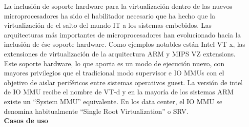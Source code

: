 La inclusión de soporte hardware para la virtualización dentro de las nuevos microprocesadores ha sido
el habilitador necesario que ha hecho que la virtualización de el salto del mundo IT a los sistemas embebidos. Las
arquitecturas más importantes de microprocesadores han evolucionado hacia la inclusión de ése soporte hardware.
Como ejemplos notables están Intel VT-x, las extensiones de virtualización de la arquitectura ARM y MIPS VZ
extensions.
Este soporte hardware, lo que aporta es un modo de ejecución nuevo, con mayores privilegios que el tradicional modo
supervisor e IO MMUs con el objetivo de aislar periféricos entre sistemas operativos guest. La versión de intel de IO MMU recibe el
nombre de VT-d y en la mayoría de los sistemas ARM existe un ``System MMU'' equivalente. En los data center, el IO MMU se denomina habitualmente ``Single Root Virtualization'' o SRV.\\[1cm]
\textbf{Casos de uso}
